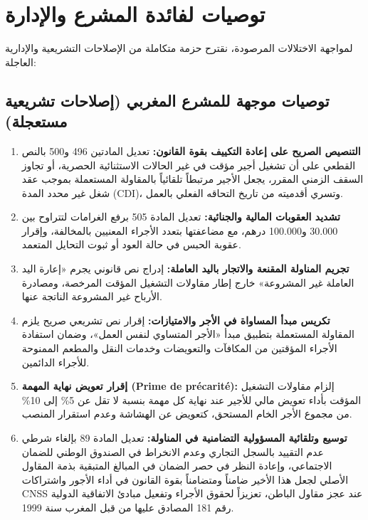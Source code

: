 \section{توصيات لفائدة المشرع والإدارة}

لمواجهة الاختلالات المرصودة، نقترح حزمة متكاملة من الإصلاحات التشريعية والإدارية العاجلة:

\subsection{توصيات موجهة للمشرع المغربي (إصلاحات تشريعية مستعجلة)}
\begin{tcolorbox}[colback=maincolor!5, colframe=maincolor, arc=5pt,
    title={\textbf{حزمة الإصلاحات التشريعية المقترحة}}]
\begin{enumerate}[leftmargin=*, itemsep=6pt]
    \item \textbf{التنصيص الصريح على إعادة التكييف بقوة القانون:} تعديل المادتين \textenglish{496} و\textenglish{500} بالنص القطعي على أن تشغيل أجير مؤقت في غير الحالات الاستثنائية الحصرية، أو تجاوز السقف الزمني المقرر، يجعل الأجير مرتبطاً تلقائياً بالمقاولة المستعملة بموجب عقد شغل غير محدد المدة (\textenglish{CDI})، وتسري أقدميته من تاريخ التحاقه الفعلي بالعمل.
    \item \textbf{تشديد العقوبات المالية والجنائية:} تعديل المادة \textenglish{505} برفع الغرامات لتتراوح بين \textenglish{30.000} و\textenglish{100.000} درهم، مع مضاعفتها بتعدد الأجراء المعنيين بالمخالفة، وإقرار عقوبة الحبس في حالة العود أو ثبوت التحايل المتعمد.
    \item \textbf{تجريم المناولة المقنعة والاتجار باليد العاملة:} إدراج نص قانوني يجرم «إعارة اليد العاملة غير المشروعة» خارج إطار مقاولات التشغيل المؤقت المرخصة، ومصادرة الأرباح غير المشروعة الناتجة عنها.
    \item \textbf{تكريس مبدأ المساواة في الأجر والامتيازات:} إقرار نص تشريعي صريح يلزم المقاولة المستعملة بتطبيق مبدأ «الأجر المتساوي لنفس العمل»، وضمان استفادة الأجراء المؤقتين من المكافآت والتعويضات وخدمات النقل والمطعم الممنوحة للأجراء الدائمين.
    \item \textbf{إقرار تعويض نهاية المهمة (\textenglish{Prime de précarité}):} إلزام مقاولات التشغيل المؤقت بأداء تعويض مالي للأجير عند نهاية كل مهمة بنسبة لا تقل عن \textenglish{5\%} إلى \textenglish{10\%} من مجموع الأجر الخام المستحق، كتعويض عن الهشاشة وعدم استقرار المنصب.
    \item \textbf{توسيع وتلقائية المسؤولية التضامنية في المناولة:} تعديل المادة \textenglish{89} بإلغاء شرطي عدم التقييد بالسجل التجاري وعدم الانخراط في الصندوق الوطني للضمان الاجتماعي، وإعادة النظر في حصر الضمان في المبالغ المتبقية بذمة المقاول الأصلي لجعل هذا الأخير ضامناً ومتضامناً بقوة القانون في أداء الأجور واشتراكات \textenglish{CNSS} عند عجز مقاول الباطن، تعزيزاً لحقوق الأجراء وتفعيل مبادئ الاتفاقية الدولية رقم \textenglish{181} المصادق عليها من قبل المغرب سنة \textenglish{1999}.
\end{enumerate}
\end{tcolorbox}

